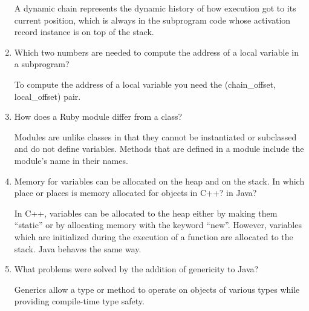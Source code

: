 \begin{enumerate}
\begin{answer}
  	A dynamic chain represents the dynamic history of how execution got to its current position, which is always in the subprogram code whose activation record instance is on top of the stack.

  \end{answer}

  \item Which two numbers are needed to compute
    the address of a local variable in a subprogram?

  \begin{answer}

  	To compute the address of a local variable you need the (chain_offset, local_offset) pair.

  \end{answer}

  \item How does a Ruby module differ from a class?

  \begin{answer}

  	Modules are unlike classes in that they cannot be instantiated or subclassed and do not define variables. Methods that are defined in a module include the  module’s name in their names.

  \end{answer}

  \item Memory for variables can be allocated on the heap
    and on the stack. In which place or places is memory
    allocated for objects in C++? in Java?

  \begin{answer}

  	In C++, variables can be allocated to the heap either by making them “static” or by allocating memory with the keyword “new”. However, variables which are initialized during the execution of a function are allocated to the stack. Java behaves the same way.

  \end{answer}

  \item What problems were solved by the addition
    of genericity to Java?

  \begin{answer}

  	Generics allow a type or method to operate on objects of various types while providing compile-time type safety.

  \end{answer}


\end{enumerate}
